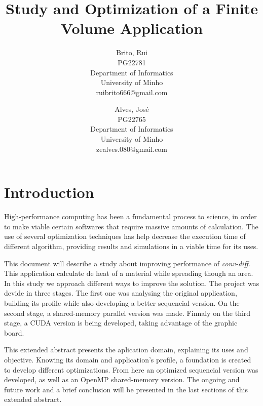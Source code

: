 \documentclass[a4paper,10pt,openright,openbib,twocolumn]{article}
\begin{document}
\begin{multicols}{2}
\title{Study and Optimization of a Finite Volume Application}
\author{
    Brito, Rui\\
    PG22781\\
    Department of Informatics\\
    University of Minho\\
    ruibrito666@gmail.com
  \and
    Alves, José\\
    PG22765\\
    Department of Informatics\\
    University of Minho\\
    zealves.080@gmail.com
}
\date{}
\maketitle
\end{multicols}

\section{Introduction}    %

High-performance computing has been a fundamental process to science, in order to make viable certain softwares that require massive amounts of calculation. The use of several optimization techniques has help decrease the execution time of different algorithm, providing results and simulations in a viable time for its uses.

This document will describe a study about improving performance of \emph{conv-diff}. This application calculate de heat of a material while spreading though an area. In this study we approach different ways to improve the solution. The project was devide in three stages. The first one was analysing the original application, building its profile while also developing a better sequencial version. 
On the second stage, a shared-memory parallel version was made. Finnaly on the third stage, a CUDA version is being developed, taking advantage of the graphic board.

This extended abstract presents the aplication domain, explaining its uses and objective. Knowing its domain and application's profile, a foundation is created to develop different optimizations. From here an optimized sequencial version was developed, as well as an OpenMP shared-memory version. The ongoing and future work and a brief conclusion will be presented in the last sections of this extended abstract.
\end{document}

